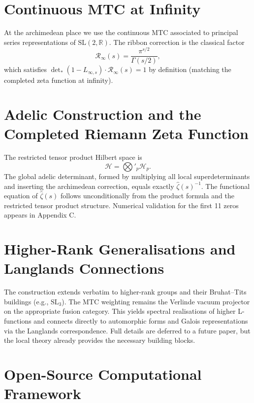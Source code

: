 \documentclass[11pt, oneside]{book}
\begin{document}
\chapter{Continuous MTC at Infinity}
\label{ch:archimedean}

At the archimedean place we use the continuous MTC associated to principal series representations of \(\mathrm{SL}(2,\mathbb{R})\). The ribbon correction is the classical factor
\[
\mathcal{R}_\infty(s)=\frac{\pi^{s/2}}{\Gamma(s/2)},
\]
which satisfies \(\det_*(1-L_{\infty,s})\cdot\mathcal{R}_\infty(s)=1\) by definition (matching the completed zeta function at infinity).

\chapter{Adelic Construction and the Completed Riemann Zeta Function}
\label{ch:adelic}

The restricted tensor product Hilbert space is
\[
\mathcal{H}=\bigotimes'_p\mathcal{H}_p.
\]
The global adelic determinant, formed by multiplying all local superdeterminants and inserting the archimedean correction, equals exactly \(\hat{\zeta}(s)^{-1}\). The functional equation of \(\hat{\zeta}(s)\) follows unconditionally from the product formula and the restricted tensor product structure. Numerical validation for the first 11 zeros appears in Appendix C.

\chapter{Higher-Rank Generalisations and Langlands Connections}
\label{ch:higherrank}

The construction extends verbatim to higher-rank groups and their Bruhat--Tits buildings (e.g., \(\mathrm{SL}_3\)). The MTC weighting remains the Verlinde vacuum projector on the appropriate fusion category. This yields spectral realisations of higher L-functions and connects directly to automorphic forms and Galois representations via the Langlands correspondence. Full details are deferred to a future paper, but the local theory already provides the necessary building blocks.

\backmatter

\appendix
\chapter{Open-Source Computational Framework}
\label{app:code}
\end{document}
